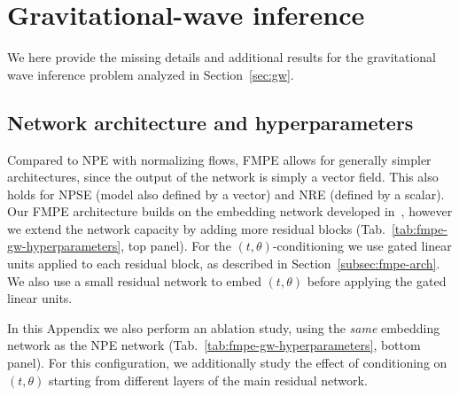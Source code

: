 \documentclass{article}
\theoremstyle{remark}
\begin{document}
\FloatBarrier
\section{Gravitational-wave inference}
\label{sec:appendix-gw}
We here provide the missing details and additional results for the gravitational wave inference problem analyzed in Section~\ref{sec:gw}.
\subsection{Network architecture and hyperparameters}
\label{sec:appendix-architecture}

Compared to NPE with normalizing flows, FMPE allows for generally simpler architectures, since the output of the network is simply a vector field. This also holds for NPSE (model also defined by a vector) and NRE (defined by a scalar). Our FMPE architecture builds on the embedding network developed in~\cite{Dax:2021tsq}, however we extend the network capacity by adding more residual blocks (Tab.~\ref{tab:fmpe-gw-hyperparameters}, top panel). For the $(t,\theta)$-conditioning we use gated linear units applied to each residual block, as described in Section~\ref{subsec:fmpe-arch}. We also use a small residual network to embed $(t,\theta)$ before applying the gated linear units.

In this Appendix we also perform an ablation study, using the \emph{same} embedding network as the NPE network (Tab.~\ref{tab:fmpe-gw-hyperparameters}, bottom panel). For this configuration, we additionally study the effect of conditioning on $(t, \theta)$ starting from different layers of the main residual network.
\end{document}
